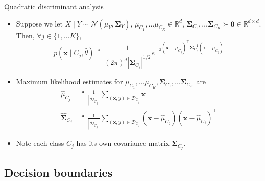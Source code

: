 \documentclass{beamer}
\numberwithin{equation}{section}
\begin{document}
\begin{frame}{Quadratic discriminant analysis}
    \begin{itemize}
        \item
        Suppose we let $ X \mid Y \sim \mathcal{N}(\mu_Y, \mathbf{\Sigma}_Y) $,
        $ \mu_{C_1}, \ldots \mu_{C_K} \in \mathbb{R}^d $,
        $ \mathbf{\Sigma}_{C_1}, \ldots \mathbf{\Sigma}_{C_K} \succ \mathbf{0}
        \in \mathbb{R}^{d \times d} $. Then, $ \forall j \in \{1, \ldots K\} $,
        \begin{equation} \label{qda_like}
            p(\mathbf{x} \mid C_j, \hat{\theta}) \triangleq \frac{1}{
                (2\pi)^d|\mathbf{\Sigma}_{C_j}|^{1 / 2}
            }e^{
                -\frac{1}{2}(\mathbf{x} - \mu_{C_j})^\top
                \mathbf{\Sigma}_{C_j}^{-1}(\mathbf{x} - \mu_{C_j})
            }
        \end{equation}

        \item
        Maximum likelihood estimates for $ \mu_{C_1}, \ldots \mu_{C_K},
        \mathbf{\Sigma}_{C_1}, \ldots \mathbf{\Sigma}_{C_K} $ are
        \begin{equation}
            \begin{split}
            \hat{\mu}_{C_j} & \triangleq \frac{1}{|\mathcal{D}_{C_j}|}
                \sum_{(\mathbf{x}, y) \in \mathcal{D}_{C_j}}\mathbf{x} \\
            \hat{\mathbf{\Sigma}}_{C_j} & \triangleq
                \frac{1}{|\mathcal{D}_{C_j}|}
                \sum_{(\mathbf{x}, y) \in \mathcal{D}_{C_j}}
                (\mathbf{x} - \hat{\mu}_{C_j})
                (\mathbf{x} - \hat{\mu}_{C_j})^\top
            \end{split}
        \end{equation}

        \item
        Note each class $ C_j $ has its own covariance matrix
        $ \mathbf{\Sigma}_{C_j} $.
    \end{itemize}
\end{frame}

\subsection{Decision boundaries}
\end{document}
